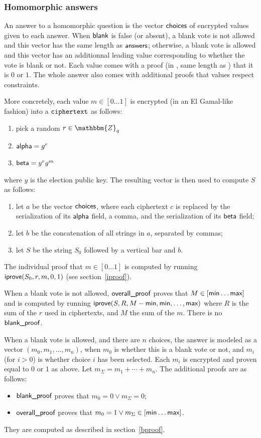 \documentclass[a4paper]{article}
\newcommand{\Z}{\mathbbm{Z}}
\begin{document}
\subsubsection{Homomorphic answers}

An answer to a homomorphic question is the vector
$\textsf{choices}$ of encrypted values given to each answer. When $\textsf{blank}$ is
false (or absent), a blank vote is not allowed and this vector has the
same length as $\textsf{answers}$; otherwise, a blank vote is allowed and this
vector has an additionnal leading value corresponding to whether the
vote is blank or not.  Each value comes with a proof (in \iproofs,
same length as \choices) that it is $0$ or $1$. The whole answer also
comes with additional proofs that values respect constraints.

More concretely, each value $m\in[0\dots1]$ is encrypted (in an El
Gamal-like fashion) into a $\texttt{ciphertext}$ as follows:
\begin{enumerate}
\item pick a random $r\in\Z_q$
\item $\textsf{alpha}=g^r$
\item $\textsf{beta}=y^rg^m$
\end{enumerate}
where $y$ is the election public key. The resulting vector is then
used to compute $S$ as follows:
\begin{enumerate}
\item let $a$ be the vector $\textsf{choices}$, where each ciphertext $c$ is
  replaced by the serialization of its $\textsf{alpha}$ field, a comma,
  and the serialization of its $\textsf{beta}$ field;
\item let $b$ be the concatenation of all strings in $a$, separated
  by commas;
\item let $S$ be the string $S_0$ followed by a vertical bar and $b$.
\end{enumerate}

The individual proof that $m\in[0\dots1]$ is computed by running
$\textsf{iprove}(S_0,r,m,0,1)$ (see section~\ref{iproof}).

When a blank vote is not allowed, $\textsf{overall\_proof}$ proves that
$M\in[\textsf{min}\dots\textsf{max}]$ and is computed by running
$\textsf{iprove}(S,R,M-\textsf{min},\textsf{min},\dots,\textsf{max})$ where $R$ is the
sum of the $r$ used in ciphertexts, and $M$ the sum of the $m$. There
is no $\textsf{blank\_proof}$.

When a blank vote is allowed, and there are $n$ choices, the answer is
modeled as a vector $(m_0,m_1,\dotsc,m_n)$, when $m_0$ is whether this
is a blank vote or not, and $m_i$ (for $i>0$) is whether choice $i$
has been selected. Each $m_i$ is encrypted and proven equal to $0$ or
$1$ as above. Let $m_\Sigma=m_1+\dotsb+m_n$. The additional proofs
are as follows:
\begin{itemize}
\item $\textsf{blank\_proof}$ proves that $m_0=0\lor m_\Sigma=0$;
\item $\textsf{overall\_proof}$ proves that $m_0=1\lor m_\Sigma\in[\textsf{min}\dots\textsf{max}]$.
\end{itemize}
They are computed as described in section~\ref{bproof}.
\end{document}
